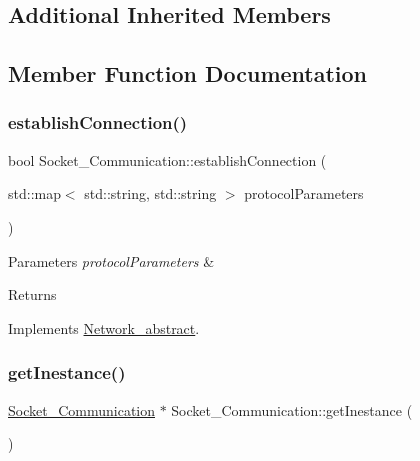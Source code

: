 \subsection*{Additional Inherited Members}


\subsection{Member Function Documentation}
\mbox{\label{class_socket___communication_a4f1352ef7ad4831c6d14472865907429}} 
\subsubsection{\texorpdfstring{establish\+Connection()}{establishConnection()}}
{\footnotesize\ttfamily bool Socket\+\_\+\+Communication\+::establish\+Connection (\begin{DoxyParamCaption}\item[{std\+::map$<$ std\+::string, std\+::string $>$}]{protocol\+Parameters }\end{DoxyParamCaption})\hspace{0.3cm}{\ttfamily [virtual]}}






\begin{DoxyParams}{Parameters}
{\em protocol\+Parameters} & \\
\hline
\end{DoxyParams}
\begin{DoxyReturn}{Returns}

\end{DoxyReturn}


Implements \mbox{\hyperlink{class_network__abstract}{Network\+\_\+abstract}}.

\mbox{\label{class_socket___communication_a7e156c8010a798636b637262adb1e38f}} 
\subsubsection{\texorpdfstring{get\+Inestance()}{getInestance()}}
{\footnotesize\ttfamily \mbox{\hyperlink{class_socket___communication}{Socket\+\_\+\+Communication}} $\ast$ Socket\+\_\+\+Communication\+::get\+Inestance (\begin{DoxyParamCaption}{ }\end{DoxyParamCaption})\hspace{0.3cm}{\ttfamily [static]}}





